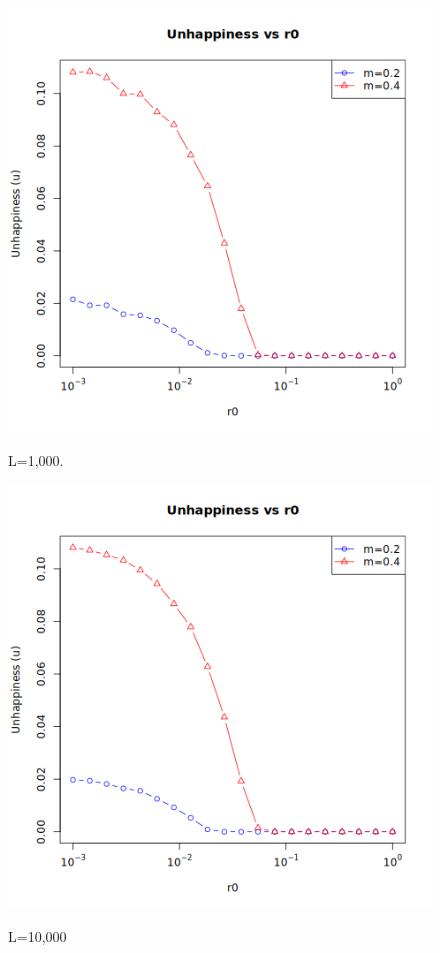 \begin{figure}[htbp]
    \centering
    \begin{minipage}[t]{0.48\linewidth}
        \centering
        \includegraphics[width=\linewidth]{images/segregation_plot_1D.png}
        \caption{L=1,000.}
        \label{fig:1,000}
    \end{minipage}
    \hfill
    \begin{minipage}[t]{0.48\linewidth}
        \centering
        \includegraphics[width=\linewidth]{images/segregation_plot_1D_1e5.png}
        \caption{L=10,000}
        \label{fig:10,000}
    \end{minipage}
    \caption{}
    \label{fig:schelling1DD}
    
\end{figure}
